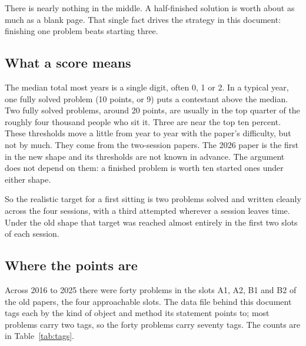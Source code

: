 There is nearly nothing in the middle. A half-finished solution is worth about as much as a blank page. That single fact drives the strategy in this document: finishing one problem beats starting three.

\subsection*{What a score means}

The median total most years is a single digit, often 0, 1 or 2. In a typical year, one fully solved problem (10 points, or 9) puts a contestant above the median. Two fully solved problems, around 20 points, are usually in the top quarter of the roughly four thousand people who sit it. Three are near the top ten percent. These thresholds move a little from year to year with the paper's difficulty, but not by much. They come from the two-session papers. The 2026 paper is the first in the new shape and its thresholds are not known in advance. The argument does not depend on them: a finished problem is worth ten started ones under either shape.

So the realistic target for a first sitting is two problems solved and written cleanly across the four sessions, with a third attempted wherever a session leaves time. Under the old shape that target was reached almost entirely in the first two slots of each session.

\subsection*{Where the points are}

Across 2016 to 2025 there were forty problems in the slots A1, A2, B1 and B2 of the old papers, the four approachable slots. The data file behind this document tags each by the kind of object and method its statement points to; most problems carry two tags, so the forty problems carry seventy tags. The counts are in Table~\ref{tab:tags}.

